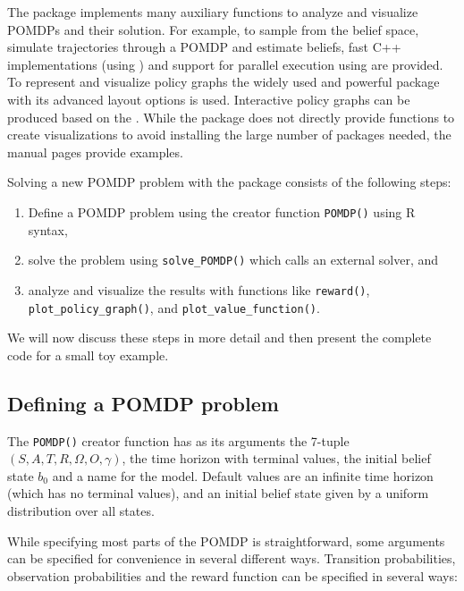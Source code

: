 The package implements many auxiliary functions to analyze and visualize POMDPs and their solution.
For example, to sample from the belief space, simulate trajectories through a
POMDP and estimate beliefs, fast C++ implementations (using  \citep{Eddelbuettel2013}) and
support for parallel execution using  \citep{Microsoft2022} are provided.
To represent and visualize policy graphs the widely used and powerful  package \citep{igraph2006}
with its advanced layout options is used. Interactive policy graphs can be produced based on the
 \citep{Almende2022}.
While the package does not directly provide functions to create  visualizations \citep{Wickham2016} to
avoid installing the large number of packages needed, the manual pages provide examples.

Solving a new POMDP problem with the  package consists of the following steps:

\begin{enumerate}
\def\labelenumi{\arabic{enumi}.}
\tightlist
\item
  Define a POMDP problem using the creator function \texttt{POMDP()} using R syntax,
\item
  solve the problem using \texttt{solve\_POMDP()} which calls an external solver, and
\item
  analyze and visualize the results with functions like \texttt{reward()},
  \texttt{plot\_policy\_graph()}, and \texttt{plot\_value\_function()}.
\end{enumerate}

We will now discuss these steps in more detail and then present the complete code for a small toy example.

\subsection{Defining a POMDP problem}\label{defining-a-pomdp-problem}

The \texttt{POMDP()} creator function has as its arguments the
7-tuple \((S, A, T, R, \Omega , O, \gamma)\),
the time horizon with terminal values, the
initial belief state \(b_0\) and a name for the model. Default values are an infinite time
horizon (which has no terminal values), and an initial belief state given by a uniform distribution over all states.

While specifying most parts of the POMDP is straightforward, some arguments can be specified for convenience in
several different ways. Transition probabilities,
observation probabilities
and the reward function
can be
specified in several ways:

